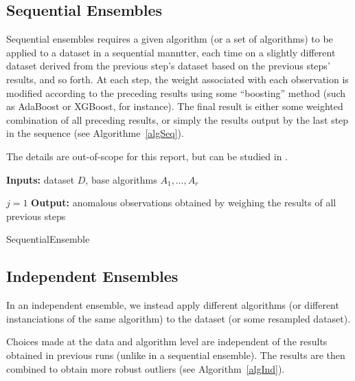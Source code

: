 \subsection*{Sequential Ensembles}
Sequential ensembles requires a given algorithm (or a set of algorithms) to be applied to a dataset in a sequential manntter, each time on a slightly different dataset derived from the previous step's dataset based on the previous steps' results, and so forth. At each step, the weight associated with each observation is modified according to the preceding results using some ``boosting'' method (such as AdaBoost or XGBoost, for instance). \newl The final result is either some weighted combination of all preceding results, or simply the results output by the last step in the sequence (see Algorithme~\ref{algSeq}). 

The details are out-of-scope for this report, but can be studied in \cite{LB}.

\begin{algorithm}
\SetAlgoLined
\textbf{Inputs:} dataset $D$, base algorithms $A_1,\ldots,A_r$ 

$j=1$\;
\textbf{Output:} anomalous observations obtained by weighing the results of all previous steps 
\caption{SequentialEnsemble}\label{algSeq}
\end{algorithm}%
\subsection*{Independent Ensembles}
In an independent ensemble, we instead apply different algorithms (or different instanciations of the same algorithm) to the dataset (or some resampled dataset). \par Choices made at the data and algorithm level
are independent of the results obtained in previous runs (unlike in a sequential ensemble). The results are then combined to obtain more robust outliers (see Algorithm~\ref{algInd}).

